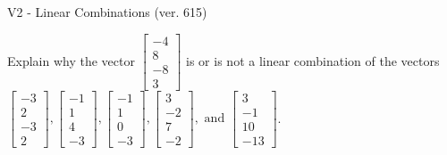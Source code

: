 \begin{exercise}
  \begin{exerciseTitle}V2 - Linear Combinations (ver. 615)\end{exerciseTitle}
  \begin{exerciseStatement}
    Explain why the vector \(\left[\begin{array}{c}
-4 \\
8 \\
-8 \\
3
\end{array}\right]\)  is or is not a linear 
	combination of the vectors \(\left[\begin{array}{c}
-3 \\
2 \\
-3 \\
2
\end{array}\right] , \left[\begin{array}{c}
-1 \\
1 \\
4 \\
-3
\end{array}\right] , \left[\begin{array}{c}
-1 \\
1 \\
0 \\
-3
\end{array}\right] , \left[\begin{array}{c}
3 \\
-2 \\
7 \\
-2
\end{array}\right] , \text{ and } \left[\begin{array}{c}
3 \\
-1 \\
10 \\
-13
\end{array}\right]\).
	



\end{exerciseStatement}
\end{exercise}
